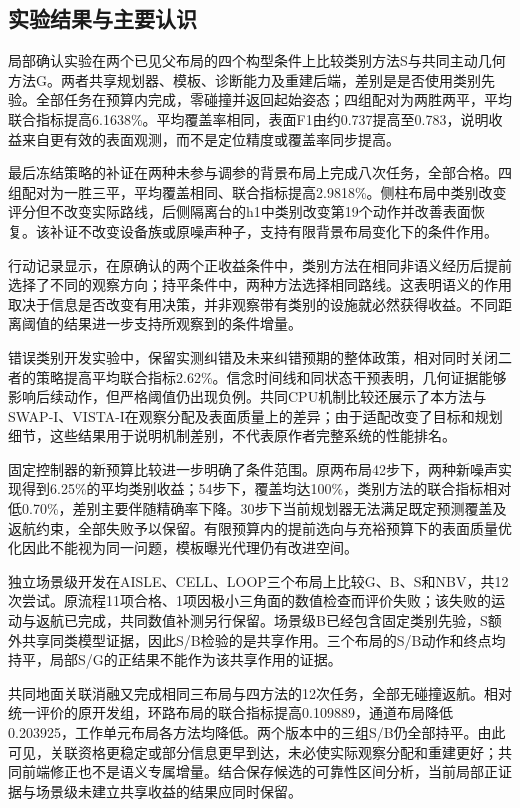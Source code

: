 \documentclass[11pt,a4paper]{article}
\numberwithin{equation}{section}
\begin{document}
\hypertarget{ux5b9eux9a8cux7ed3ux679cux4e0eux4e3bux8981ux8ba4ux8bc6}{%
\subsection{实验结果与主要认识}\label{ux5b9eux9a8cux7ed3ux679cux4e0eux4e3bux8981ux8ba4ux8bc6}}

局部确认实验在两个已见父布局的四个构型条件上比较类别方法S与共同主动几何方法G。两者共享规划器、模板、诊断能力及重建后端，差别是是否使用类别先验。全部任务在预算内完成，零碰撞并返回起始姿态；四组配对为两胜两平，平均联合指标提高6.1638\%。平均覆盖率相同，表面F1由约0.737提高至0.783，说明收益来自更有效的表面观测，而不是定位精度或覆盖率同步提高。

最后冻结策略的补证在两种未参与调参的背景布局上完成八次任务，全部合格。四组配对为一胜三平，平均覆盖相同、联合指标提高2.9818\%。侧柱布局中类别改变评分但不改变实际路线，后侧隔离台的h1中类别改变第19个动作并改善表面恢复。该补证不改变设备族或原噪声种子，支持有限背景布局变化下的条件作用。

行动记录显示，在原确认的两个正收益条件中，类别方法在相同非语义经历后提前选择了不同的观察方向；持平条件中，两种方法选择相同路线。这表明语义的作用取决于信息是否改变有用决策，并非观察带有类别的设施就必然获得收益。不同距离阈值的结果进一步支持所观察到的条件增量。

错误类别开发实验中，保留实测纠错及未来纠错预期的整体政策，相对同时关闭二者的策略提高平均联合指标2.62\%。信念时间线和同状态干预表明，几何证据能够影响后续动作，但严格阈值仍出现负例。共同CPU机制比较还展示了本方法与SWAP-I、VISTA-I在观察分配及表面质量上的差异；由于适配改变了目标和规划细节，这些结果用于说明机制差别，不代表原作者完整系统的性能排名。

固定控制器的新预算比较进一步明确了条件范围。原两布局42步下，两种新噪声实现得到6.25\%的平均类别收益；54步下，覆盖均达100\%，类别方法的联合指标相对低0.70\%，差别主要伴随精确率下降。30步下当前规划器无法满足既定预测覆盖及返航约束，全部失败予以保留。有限预算内的提前选向与充裕预算下的表面质量优化因此不能视为同一问题，模板曝光代理仍有改进空间。

独立场景级开发在AISLE、CELL、LOOP三个布局上比较G、B、S和NBV，共12次尝试。原流程11项合格、1项因极小三角面的数值检查而评价失败；该失败的运动与返航已完成，共同数值补测另行保留。场景级B已经包含固定类别先验，S额外共享同类模型证据，因此S/B检验的是共享作用。三个布局的S/B动作和终点均持平，局部S/G的正结果不能作为该共享作用的证据。

共同地面关联消融又完成相同三布局与四方法的12次任务，全部无碰撞返航。相对统一评价的原开发组，环路布局的联合指标提高0.109889，通道布局降低0.203925，工作单元布局各方法均降低。两个版本中的三组S/B仍全部持平。由此可见，关联资格更稳定或部分信息更早到达，未必使实际观察分配和重建更好；共同前端修正也不是语义专属增量。结合保存候选的可靠性区间分析，当前局部正证据与场景级未建立共享收益的结果应同时保留。
\end{document}
